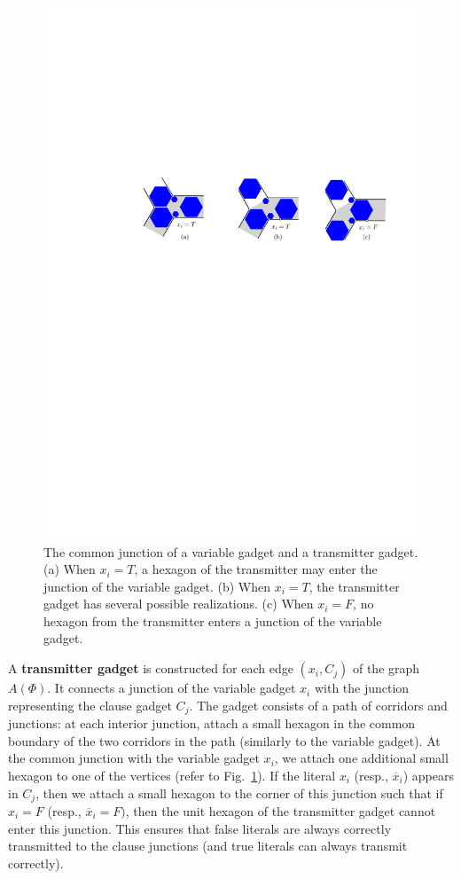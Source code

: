 \documentclass{article}
\theoremstyle{plain}%
\begin{document}
\begin{figure}[htbp]
	\centering
	\includegraphics[width=0.7\columnwidth]{fig-transmitter-hex}
	\caption{The common junction of a variable gadget and a transmitter gadget.
(a) When $x_i=T$, a hexagon of the transmitter may enter the junction of the variable gadget.
(b) When $x_i=T$, the transmitter gadget has several possible realizations.
(c) When $x_i=F$, no hexagon from the transmitter enters a junction of the variable gadget.}
	\label{fig:transmitter}
\end{figure}

A {\bf transmitter gadget} is constructed for each edge $(x_i,C_j)$ of the graph $A(\Phi)$.
It connects a junction of the variable gadget $x_i$ with the junction representing the clause gadget $C_j$. The gadget consists of a path of corridors and junctions: at each interior junction, attach a small hexagon in the common boundary of the two corridors in the path (similarly to the variable gadget). At the common junction with the variable gadget $x_i$, we attach one additional small hexagon to one of the vertices (refer to Fig.~\ref{fig:transmitter}). If the literal $x_i$ (resp., $\overline{x}_i$) appears in $C_j$, then we attach a small hexagon to the corner of this junction such that if $x_i=F$ (resp., $\overline{x}_i=F)$, then the unit hexagon of the transmitter gadget cannot enter this junction. This ensures that false literals are always correctly transmitted to the clause junctions (and true literals can always transmit correctly).
\end{document}
